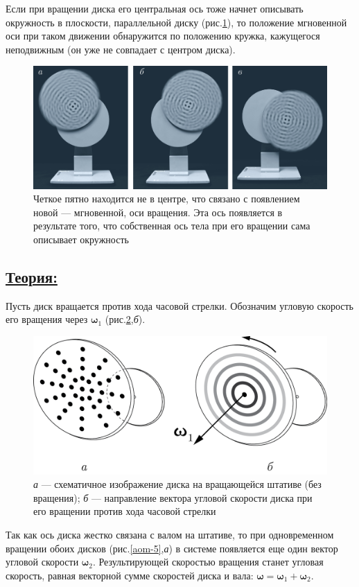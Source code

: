 \documentclass[14pt,a4paper,twoside]{extarticle}	%
\begin{document}
Если при вращении диска его центральная ось тоже начнет описывать окружность в плоскости, параллельной диску (рис.\ref{aom-3}), то положение мгновенной оси при таком движении обнаружится по положению кружка, кажущегося неподвижным (он уже не совпадает с центром диска).

\begin{figure}[H]
	\centering 	
	\includegraphics[width=0.9\linewidth]{aom-3.png}
	\caption{Четкое пятно находится не в центре, что связано с появлением новой — мгновенной, оси вращения. Эта ось появляется в результате того, что собственная ось тела при его вращении сама описывает окружность}
	\label{aom-3}
\end{figure}

\newpage
\subsection*{\underline{Теория:}}

Пусть диск вращается против хода часовой стрелки.
Обозначим угловую скорость его вращения через $ \textbf{ω}_1 $ (рис.\ref{aom-4},\textit{б}).

\begin{figure}[H] 
	\centering 	
	\includegraphics[width=0.75\linewidth]{aom-4.png}
	\caption{\textit{а} — схематичное изображение диска на вращающейся штативе (без вращения); \textit{б} — направление вектора угловой скорости диска при его вращении против хода часовой стрелки}
	\label{aom-4}
\end{figure}

Так как ось диска жестко связана с валом на штативе, то при одновременном вращении обоих дисков (рис.\ref{aom-5},\textit{а}) в системе появляется еще один вектор угловой скорости $ \textbf{ω}_2 $.
Результирующей скоростью вращения станет угловая скорость, равная векторной сумме скоростей диска и вала: $\textbf{ω} = \textbf{ω}_1 + \textbf{ω}_2$.
\end{document}
